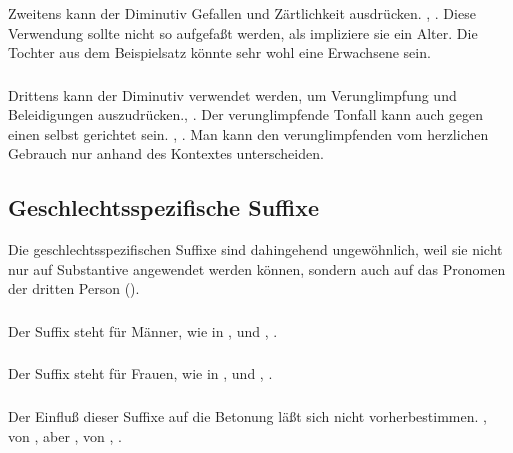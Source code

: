 \subsubsection{} Zweitens kann der Diminutiv Gefallen und Z\"artlichkeit ausdr\"ucken.
, .
Diese Verwendung sollte nicht so aufgefa\ss{}t werden, als impliziere sie
ein Alter. Die Tochter aus dem Beispielsatz k\"onnte sehr wohl eine Erwachsene
sein.

\subsubsection{} Drittens kann der Diminutiv verwendet werden, um Verunglimpfung und
Beleidigungen auszudr\"ucken.,
. Der verunglimpfende
Tonfall kann auch gegen einen selbst gerichtet sein.
, . Man kann den verunglimpfenden
vom herzlichen Gebrauch nur anhand des Kontextes unterscheiden.



\subsection{Geschlechtsspezifische Suffixe} Die geschlechtsspezifischen Suffixe sind
dahingehend ungew\"ohnlich, weil sie nicht nur auf Substantive angewendet werden k\"onnen,
sondern auch auf das Pronomen der dritten Person ().
\label{lingop:suffix:gender}

\subsubsection{} Der Suffix  steht f\"ur M\"anner, wie in , 
und , .

\subsubsection{} Der Suffix  steht f\"ur Frauen, wie in , 
und , .

\subsubsection{} Der Einflu\ss{} dieser Suffixe auf die Betonung l\"a\ss{}t sich nicht
vorherbestimmen. ,  von 
, aber ,  von
, .


